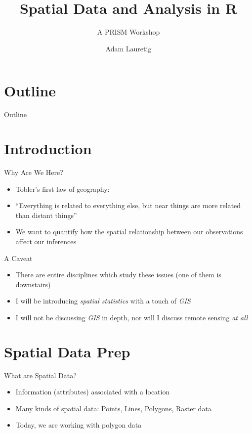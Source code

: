 \documentclass[aspectratio = 169, 12pt]{beamer}\usepackage[]{graphicx}\usepackage[]{color}
\title[]{Spatial Data and Analysis in R}
\subtitle[]{A PRISM Workshop}
\author[]{Adam Lauretig}
\institute[]{The Ohio State University}
\date{}
\begin{document}
\titlepage     %

\section*{Outline}     %

\begin{frame}{Outline}
  \tableofcontents
\end{frame}

\beamerdefaultoverlayspecification{<+->}

\section{Introduction}     %

\begin{frame}{Why Are We Here?}     %
\begin{itemize}
\item Tobler's first law of geography:
\item ``Everything is related to everything else, but near things are more related than distant things''
\item We want to quantify how the spatial relationship between our observations affect our inferences
\end{itemize}
\end{frame}

\begin{frame}{A Caveat}
\begin{itemize}
\item There are entire disciplines which study these issues (one of them is downstairs)
\item I will be introducing \textit{spatial statistics} with a touch of \textit{GIS}
\item I will not be discussing \textit{GIS} in depth, nor will I discuss remote sensing \textit{at all}
\end{itemize}

\end{frame}


\section{Spatial Data Prep}
\begin{frame}{What are Spatial Data?}
\begin{itemize}
\item Information (attributes) associated with a location
\item Many kinds of spatial data: Points, Lines, Polygons, Raster data
\item Today, we are working with polygon data
\end{itemize}

\end{frame}
\end{document}
